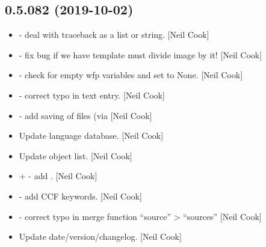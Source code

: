 \documentclass[a4paper,10pt,english]{report}
\begin{document}
\subsection{0.5.082 (2019-10-02)}
\label{\detokenize{misc/changelog:id61}}\begin{itemize}
\item {} 
 - deal with traceback as a list or
string. {[}Neil Cook{]}

\item {} 
 - fix bug if we have template must divide
image by it! {[}Neil Cook{]}

\item {} 
 - check for empty wfp variables and set to None.
{[}Neil Cook{]}

\item {} 
 - correct typo in text entry.
{[}Neil Cook{]}

\item {} 
 - add saving of files (via 
{[}Neil Cook{]}

\item {} 
Update language database. {[}Neil Cook{]}

\item {} 
Update object list. {[}Neil Cook{]}

\item {} 
 +  -
add . {[}Neil Cook{]}

\item {} 
 - add CCF keywords. {[}Neil Cook{]}

\item {} 
 - correct typo in merge function
“source” \textendash{}\textgreater{} “sources” {[}Neil Cook{]}

\item {} 
Update date/version/changelog. {[}Neil Cook{]}

\end{itemize}
\end{document}
